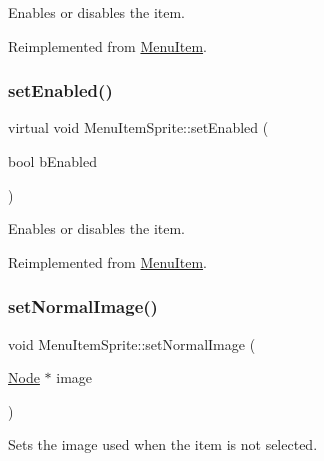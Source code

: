 Enables or disables the item. 

Reimplemented from \hyperlink{classMenuItem_abe370fd6258192233b6bd9534344773b}{Menu\+Item}.

\mbox{\label{classMenuItemSprite_ae64b755275632b2c8f4bae41a6b23287}} 
\subsubsection{\texorpdfstring{set\+Enabled()}{setEnabled()}\hspace{0.1cm}{\footnotesize\ttfamily [2/2]}}
{\footnotesize\ttfamily virtual void Menu\+Item\+Sprite\+::set\+Enabled (\begin{DoxyParamCaption}\item[{bool}]{b\+Enabled }\end{DoxyParamCaption})\hspace{0.3cm}{\ttfamily [virtual]}}

Enables or disables the item. 

Reimplemented from \hyperlink{classMenuItem_abe370fd6258192233b6bd9534344773b}{Menu\+Item}.

\mbox{\label{classMenuItemSprite_a27ddb3eec072386e1e34034c185a3b45}} 
\subsubsection{\texorpdfstring{set\+Normal\+Image()}{setNormalImage()}\hspace{0.1cm}{\footnotesize\ttfamily [1/2]}}
{\footnotesize\ttfamily void Menu\+Item\+Sprite\+::set\+Normal\+Image (\begin{DoxyParamCaption}\item[{\hyperlink{classNode}{Node} $\ast$}]{image }\end{DoxyParamCaption})}

Sets the image used when the item is not selected. \mbox{\label{classMenuItemSprite_a27ddb3eec072386e1e34034c185a3b45}} 
